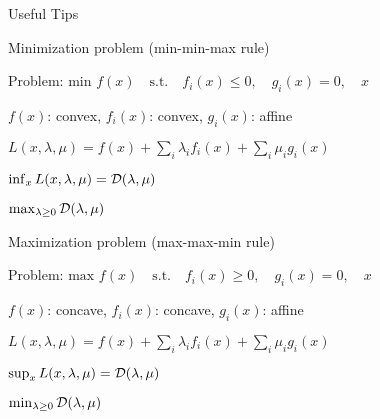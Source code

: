 \documentclass[handout,fleqn,aspectratio=169]{beamer}
\begin{document}
\begin{frame}{Useful Tips}

\plitemsep 0.03in
\bci 
\item Minimization problem ({\red min-min-max} rule)
\bci

  \item Problem: $\text{min }f(x) \quad \text{s.t.}  \quad f_i(x) \leq 0, \quad
      g_i(x)  = 0, \quad x$ 
  \item $f(x)$: convex, $f_i(x)$: convex, $g_i(x)$: affine \medskip
  \item $L(x,\lambda,\mu) = f(x) + \sum_i \lambda_i f_i(x) + \sum_i
    \mu_i g_i(x)$
  \item $\inf_{x} L(x,\lambda,\mu) = {\cal D}(\lambda,\mu)$
  \item  $\max_{\lambda \geq 0} {\cal D}(\lambda,\mu)$

\eci

\item Maximization problem ({\red max-max-min} rule)
  
\bci
  \item Problem: $\text{max } f(x) \quad \text{s.t.}  \quad f_i(x) \geq 0, \quad
      g_i(x)  = 0, \quad x$ 
  \item $f(x)$: concave, $f_i(x)$: concave, $g_i(x)$: affine \medskip
  \item $L(x,\lambda,\mu) = f(x) + \sum_i \lambda_i f_i(x) + \sum_i
    \mu_i g_i(x)$
  \item $\sup_{x} L(x,\lambda,\mu) = {\cal D}(\lambda,\mu)$
  \item  $\min_{\lambda \geq 0} {\cal D}(\lambda,\mu)$
\eci

\eci

\end{frame}
\end{document}
